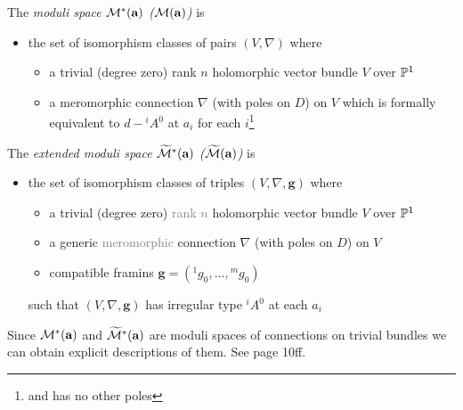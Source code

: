 \begin{defn}[2.5]
  The \emph{moduli space $\cM^*(\textbf{a})$
  \textcolor{green!40!black}{($\cM(\textbf{a})$)}} is
  \begin{itemize}
    \item the set of isomorphism classes of pairs $(V,\nabla)$ where
      \begin{itemize}
        \item a trivial \textcolor{green!40!black}{(degree zero)} rank $n$
          holomorphic vector bundle $V$ over $\P^1$
        \item a meromorphic connection $\nabla$ (with poles on $D$) on $V$
          which is formally equivalent to $d-{}^iA^0$ at $a_i$ for each
          $i$\footnote{and has no other poles}
      \end{itemize}
  \end{itemize}
\end{defn}
\begin{defn}[2.6]
  The \emph{extended moduli space $\widetilde\cM^*(\textbf{a})$
  \textcolor{green!40!black}{($\widetilde\cM(\textbf{a})$)}} is
  \begin{itemize}
    \item the set of isomorphism classes of triples $(V,\nabla,\textbf{g})$
      where
      \begin{itemize}
        \item a trivial \textcolor{green!40!black}{(degree zero)}
          \textcolor{gray}{rank $n$} holomorphic vector bundle $V$ over $\P^1$
        \item a generic \textcolor{gray}{meromorphic} connection $\nabla$
          (with poles on $D$) on $V$
        \item compatible framins $\textbf{g}=({}^1g_0,\dots,{}^mg_0)$
      \end{itemize}
      such that $(V,\nabla,\textbf{g})$ has irregular type ${}^iA^0$ at each
      $a_i$
  \end{itemize}
\end{defn}
Since $\cM^*(\textbf{a})$ and $\widetilde\cM^*(\textbf{a})$ are moduli spaces
of connections on trivial bundles we can obtain explicit descriptions of them.
See \cite{thboalch} page 10ff.

